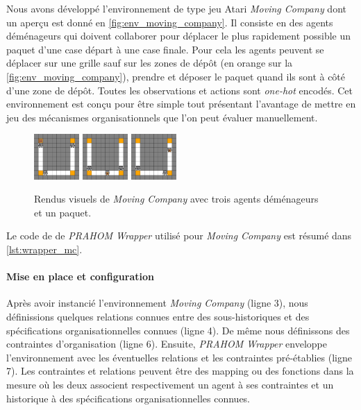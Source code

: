 \documentclass[demonstration]{jfsma}
\newcounter{relation}
\begin{document}
Nous avons développé l'environnement de type jeu Atari \emph{Moving Company} dont un aperçu est donné en \autoref{fig:env_moving_company}. Il consiste en des agents déménageurs qui doivent collaborer pour déplacer le plus rapidement possible un paquet d'une case départ à une case finale. Pour cela les agents peuvent se déplacer sur une grille sauf sur les zones de dépôt (en orange sur la \autoref{fig:env_moving_company}), prendre et déposer le paquet quand ils sont à côté d'une zone de dépôt. Toutes les observations et actions sont \emph{one-hot} encodés. Cet environnement est conçu pour être simple tout présentant l'avantage de mettre en jeu des mécanismes organisationnels que l'on peut évaluer manuellement.
%
\begin{figure}[h!]
  \centering
  \includegraphics[width=0.154\textwidth]{figures/moving_company_1.png}
  \includegraphics[width=0.154\textwidth]{figures/moving_company_2.png}
  \includegraphics[width=0.154\textwidth]{figures/moving_company_3.png}
  \caption{Rendus visuels de \emph{Moving Company} avec trois agents déménageurs et un paquet.}
  \label{fig:env_moving_company}
\end{figure}
%
Le code de de \emph{PRAHOM Wrapper} utilisé pour \emph{Moving Company} est résumé dans \autoref{lst:wrapper_mc}.

\paragraph{Mise en place et configuration}

Après avoir instancié l'environnement \emph{Moving Company} (ligne 3), nous définissions quelques relations connues entre des sous-historiques et des spécifications organisationnelles connues (ligne 4). De même nous définissons des contraintes d'organisation (ligne 6). Ensuite, \emph{PRAHOM Wrapper} enveloppe l'environnement avec les éventuelles relations et les contraintes pré-établies (ligne 7). Les contraintes et relations peuvent être des mapping ou des fonctions dans la mesure où les deux associent respectivement un agent à ses contraintes et un historique à des spécifications organisationnelles connues.
\end{document}
